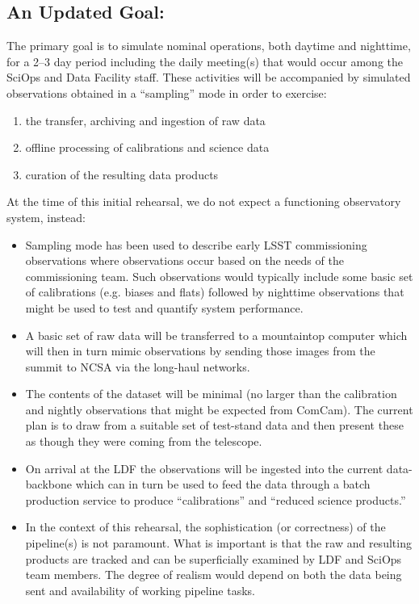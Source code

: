 \clearpage

\subsection{An Updated Goal:}

The primary goal is to simulate nominal operations, both daytime and nighttime, for a 2--3 day 
period including the daily meeting(s) that would occur among the SciOps and 
Data Facility staff.  These activities will be accompanied by simulated 
observations obtained in a ``sampling'' mode in order to exercise:
\begin{enumerate}
\item the transfer, archiving and ingestion of raw data
\item offline processing of 
calibrations and science data
\item curation of the resulting data products
\end{enumerate}

At the time of this initial rehearsal, we do not expect a functioning 
observatory system, instead:

\begin{itemize}[topsep=0pt]
\item Sampling mode has been used to describe early LSST commissioning 
observations where observations occur based on the needs of the commissioning 
team.  Such observations would typically include some basic set of calibrations
(e.g. biases and flats) followed by nighttime observations that might be used to 
test and quantify system performance.

\item A basic set of raw data will be transferred to a mountaintop computer 
which will then in turn mimic observations by sending those images from the
summit to NCSA via the long-haul networks.

\item The contents of the dataset will be minimal (no larger than the 
calibration and nightly observations that might be expected from ComCam).  
The current plan is to draw from a suitable set of test-stand data and 
then present these as though they were coming from the telescope.

\item On arrival at the LDF the observations will be ingested into the current 
data-backbone which can in turn be used to feed the data through a batch 
production service to produce ``calibrations'' and ``reduced science products.''

\item In the context of this rehearsal, the sophistication (or correctness) 
of the pipeline(s) is not paramount.  What is important is that the raw and 
resulting products are tracked and can be superficially examined by LDF and 
SciOps team members.  The degree of realism would depend on both the data
being sent and availability of working pipeline tasks.
\end{itemize}


